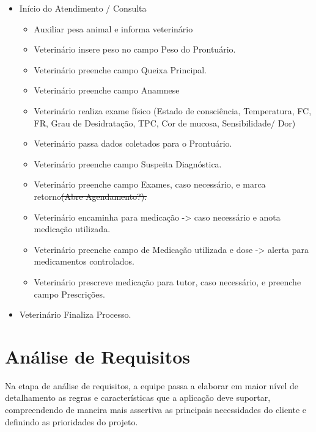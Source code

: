 \documentclass[
    12pt,               %
    openright,          %
    oneside,
    a4paper,            %
    BIBLATEX,           %
    TODO,               %
    english,            %
    brazil              %
    ]{ifsp-spo-inf-ctds}
\providecommand{\DIFadd}[1]{{\protect\color{blue}\uwave{#1}}} %
\providecommand{\DIFdel}[1]{{\protect\color{red}\sout{#1}}}                      %
\providecommand{\DIFaddbegin}{} %
\providecommand{\DIFaddend}{} %
\providecommand{\DIFdelbegin}{} %
\providecommand{\DIFdelend}{} %
\newcommand{\DIFscaledelfig}{0.5}
\newlength{\DIFdelgraphicswidth} %
\newlength{\DIFdelgraphicsheight} %
\newcommand{\DIFaddincludegraphics}[2][]{{\color{blue}\fbox{\DIFOincludegraphics[#1]{#2}}}} %
\newcommand{\DIFdelincludegraphics}[2][]{%
\sbox{\DIFdelgraphicsbox}{\DIFOincludegraphics[#1]{#2}}%
\settoboxwidth{\DIFdelgraphicswidth}{\DIFdelgraphicsbox} %
\settoboxtotalheight{\DIFdelgraphicsheight}{\DIFdelgraphicsbox} %
\scalebox{\DIFscaledelfig}{%
\parbox[b]{\DIFdelgraphicswidth}{\usebox{\DIFdelgraphicsbox}\\[-\baselineskip] \rule{\DIFdelgraphicswidth}{0em}}\llap{\resizebox{\DIFdelgraphicswidth}{\DIFdelgraphicsheight}{%
\setlength{\unitlength}{\DIFdelgraphicswidth}%
\begin{picture}(1,1)%
\thicklines\linethickness{2pt} %
{\color[rgb]{1,0,0}\put(0,0){\framebox(1,1){}}}%
{\color[rgb]{1,0,0}\put(0,0){\line( 1,1){1}}}%
{\color[rgb]{1,0,0}\put(0,1){\line(1,-1){1}}}%
\end{picture}%
}\hspace*{3pt}}} %
} %
\DeclareRobustCommand{\DIFaddbegin}{\DIFOaddbegin \let\includegraphics\DIFaddincludegraphics} %
\DeclareRobustCommand{\DIFaddend}{\DIFOaddend \let\includegraphics\DIFOincludegraphics} %
\DeclareRobustCommand{\DIFdelbegin}{\DIFOdelbegin \let\includegraphics\DIFdelincludegraphics} %
\DeclareRobustCommand{\DIFdelend}{\DIFOaddend \let\includegraphics\DIFOincludegraphics} %
\begin{document}
    \begin{itemize}
        \item Início do Atendimento / Consulta 

        \begin{itemize}
            \item Auxiliar pesa animal e informa veterinário
            \item Veterinário insere peso no campo Peso do Prontuário.
            \item Veterinário preenche campo Queixa Principal.
            \item Veterinário preenche campo Anamnese 
            \item Veterinário realiza exame físico (Estado de consciência, Temperatura, FC, FR, Grau de Desidratação, TPC, Cor de mucosa, Sensibilidade/ Dor)
            \item Veterinário passa dados coletados para o Prontuário.
            \item Veterinário preenche campo Suspeita Diagnóstica.
            \item Veterinário preenche campo Exames, caso necessário, e marca retorno\DIFdelbegin \DIFdel{(Abre Agendamento?).
            }\DIFdelend \DIFaddbegin \DIFadd{.
            }\DIFaddend \item Veterinário encaminha para medicação -> caso necessário e anota medicação utilizada.
            \item Veterinário preenche campo de Medicação utilizada e dose -> alerta para medicamentos controlados.
            \item Veterinário prescreve medicação para tutor, caso necessário, e preenche campo Prescrições.

        \end{itemize}
        \item Veterinário Finaliza Processo.
    \end{itemize}

	
  



     
    \section{Análise de Requisitos}

        Na etapa de análise de requisitos, a equipe passa a elaborar em maior nível de detalhamento as regras e características que a aplicação deve suportar, compreendendo de maneira mais assertiva as principais necessidades do cliente e definindo as prioridades do projeto.
\end{document}
